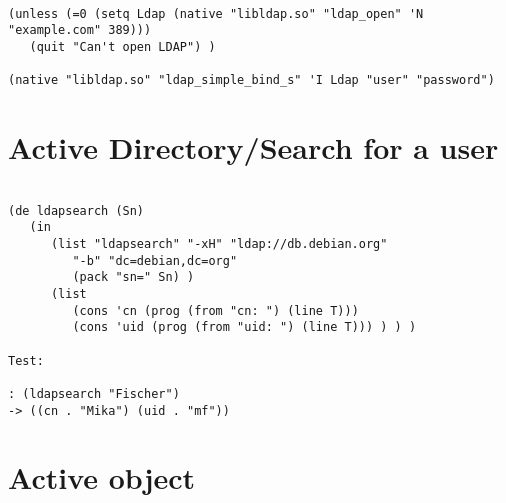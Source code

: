 \begin{verbatim}

(unless (=0 (setq Ldap (native "libldap.so" "ldap_open" 'N "example.com" 389)))
   (quit "Can't open LDAP") )

(native "libldap.so" "ldap_simple_bind_s" 'I Ldap "user" "password")

\end{verbatim}

\section*{Active Directory/Search for a user}

\begin{verbatim}

(de ldapsearch (Sn)
   (in
      (list "ldapsearch" "-xH" "ldap://db.debian.org"
         "-b" "dc=debian,dc=org"
         (pack "sn=" Sn) )
      (list
         (cons 'cn (prog (from "cn: ") (line T)))
         (cons 'uid (prog (from "uid: ") (line T))) ) ) )

Test:

: (ldapsearch "Fischer")
-> ((cn . "Mika") (uid . "mf"))

\end{verbatim}

\section*{Active object}

